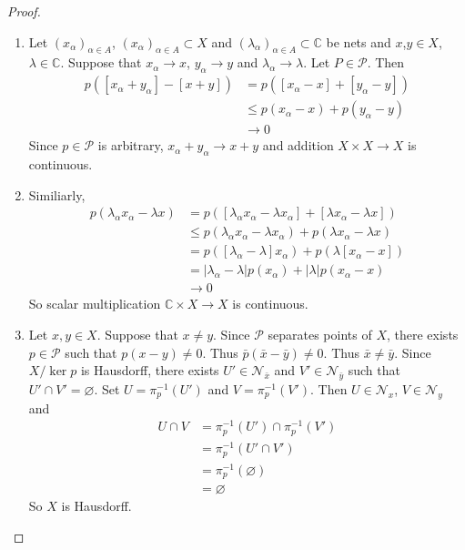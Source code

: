 \documentclass[12pt]{amsart}
\theoremstyle{definition}
\newcommand{\al}{\alpha}
\newcommand{\lam}{\lambda}
\newcommand{\C}{\mathbb{C}}
\newcommand{\MN}{\mathcal{N}}
\newcommand{\MP}{\mathcal{P}}
\begin{document}
	\begin{proof}\
		\begin{enumerate}
			\item Let $(x_{\al})_{\al \in A}$, $(x_{\al})_{\al \in A} \subset X$ and $(\lam_{\al})_{\al \in A} \subset \C$ be nets and $x$,$y \in X$, $\lam \in \C$. Suppose that $x_{\al} \rightarrow x$, $y_{\al} \rightarrow y$ and $\lam_{\al} \rightarrow \lam$. Let $P \in \MP$. Then 
			\begin{align*}
				p([x_{\al} + y_{\al}] - [x + y]) 
				&= p([x_{\al} - x] + [y_{\al} - y]) \\
				&\leq p(x_{\al} - x) + p(y_{\al} - y) \\
				& \rightarrow 0
			\end{align*}
			Since $p \in \MP$ is arbitrary, $x_{\al} + y_{\al} \rightarrow x + y$ and addition $X \times X \rightarrow X$ is continuous. \\
			
			\item Similiarly, 
			\begin{align*}
				p(\lam_{\al} x_{\al} - \lam x) 
				&= p([\lam_{\al} x_{\al} - \lam x_{\al}] + [\lam x_{\al} - \lam x]) \\
				& \leq p(\lam_{\al} x_{\al} - \lam x_{\al}) + p(\lam x_{\al} - \lam x) \\
				&= p([\lam_{\al} - \lam] x_{\al}) + p(\lam [x_{\al} - x]) \\
				&= |\lam_{\al} - \lam|p(x_{\al}) + |\lam|p(x_{\al} - x) \\
				&\rightarrow 0 
			\end{align*}
			So scalar multiplication $ \C \times X \rightarrow X$ is  continuous. \\

			\item Let $x, y \in X$. Suppose that $x \neq y$. Since $\MP$ separates points of $X$, there exists $p \in \MP$ such that $p(x - y) \neq 0$. Thus $\bar{p}(\bar{x} - \bar{y}) \neq 0$. Thus $\bar{x} \neq \bar{y}$. Since $X / \ker p$ is Hausdorff, there exists $U' \in \MN_{\bar{x}}$ and $V' \in \MN_{\bar{y}}$ such that $U' \cap V' = \varnothing$. Set $U = \pi_p^{-1}(U')$ and $V =  \pi_p^{-1}(V')$. Then $U \in \MN_x$, $V \in \MN_y$ and  
			\begin{align*}
				U \cap V 
				&= \pi_p^{-1}(U') \cap  \pi_p^{-1}(V') \\
				&=  \pi_p^{-1}(U' \cap V') \\
				&=  \pi_p^{-1}(\varnothing) \\
				&= \varnothing
			\end{align*}
			So $X$ is Hausdorff.
		\end{enumerate}
	\end{proof}
\end{document}
